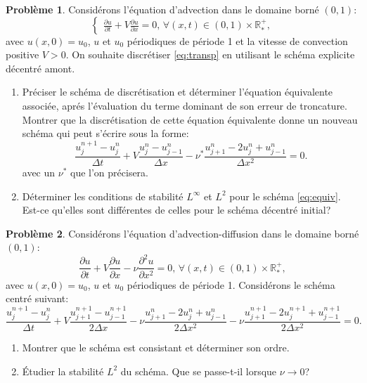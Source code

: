 \documentclass[12pt,a4paper]{article}
\begin{document}
{\bf Probl\`eme 1}. Consid\'erons l'\'equation d'advection dans le domaine born\'e $(0,1)$:
\begin{equation}\label{eq:transp}
\begin{cases}
\displaystyle\frac{\partial u}{\partial t}+V\frac{\partial u}{\partial
  x}=0,\, \forall (x,t)\in(0,1)\times\mathbb{R}^+_*,
\end{cases}
\end{equation}
avec $u(x, 0) = u_0$, $u$ et $u_0$ p\'eriodiques de p\'eriode 1 et la
vitesse de convection positive $V>0$. On souhaite discr\'etiser \eqref{eq:transp}
en utilisant le sch\'ema explicite d\'ecentr\'e amont.
\begin{enumerate}
\item Pr\'eciser le sch\'ema de discr\'etisation et d\'eterminer l'\'equation \'equivalente associ\'ee,
  apr\'es l'\'evaluation du terme dominant de son erreur de
  troncature. Montrer que la discr\'etisation de cette \'equation
  \'equivalente donne un nouveau sch\'ema qui peut s'\'ecrire sous la
  forme:
\begin{equation}\label{eq:equiv}
\frac{u_j^{n+1}-u_{j}^{n}}{\Delta t}+V
\frac{u_{j}^{n}-u_{j-1}^{n}}{\Delta x}-\nu^*\frac{u_{j+1}^{n}-2u_j^n+u_{j-1}^{n}}{\Delta x^2}=0.
\end{equation}
avec un $\nu^*$ que l'on pr\'ecisera.
\item D\'eterminer les conditions de stabilit\'e $L^{\infty}$ et $L^2$
  pour le sch\'ema \eqref{eq:equiv}. Est-ce qu'elles sont
  diff\'erentes de celles pour le sch\'ema d\'ecentr\'e initial?
\end{enumerate}
{\bf Probl\`eme 2}. Consid\'erons l'\'equation d'advection-diffusion dans le domaine born\'e $(0,1)$:
\begin{equation}
\displaystyle\frac{\partial u}{\partial t}+V\frac{\partial u}{\partial
  x}-\nu\frac{\partial^2u}{\partial x^2}=0,\, \forall (x,t)\in(0,1)\times\mathbb{R}^+_*,
\end{equation}
avec $u(x, 0) = u_0$, $u$ et $u_0$ p\'eriodiques de p\'eriode 1.
Consid\'erons le sch\'ema centr\'e suivant:
$$
\frac{u_j^{n+1}-u_{j}^{n}}{\Delta t}+V
\frac{u_{j+1}^{n+1}-u_{j-1}^{n+1}}{2\Delta x}-\nu\frac{u_{j+1}^{n}-2u_j^n+u_{j-1}^{n}}{2\Delta x^2}-\nu\frac{u_{j+1}^{n+1}-2u_j^{n+1}+u_{j-1}^{n+1}}{2\Delta x^2}=0.
$$
\begin{enumerate}
\item Montrer que le sch\'ema est consistant et d\'eterminer son ordre.
\item \'Etudier la stabilit\'e $L^2$ du sch\'ema. Que se passe-t-il lorsque
$\nu \rightarrow 0$?
\end{enumerate}
\end{document}
